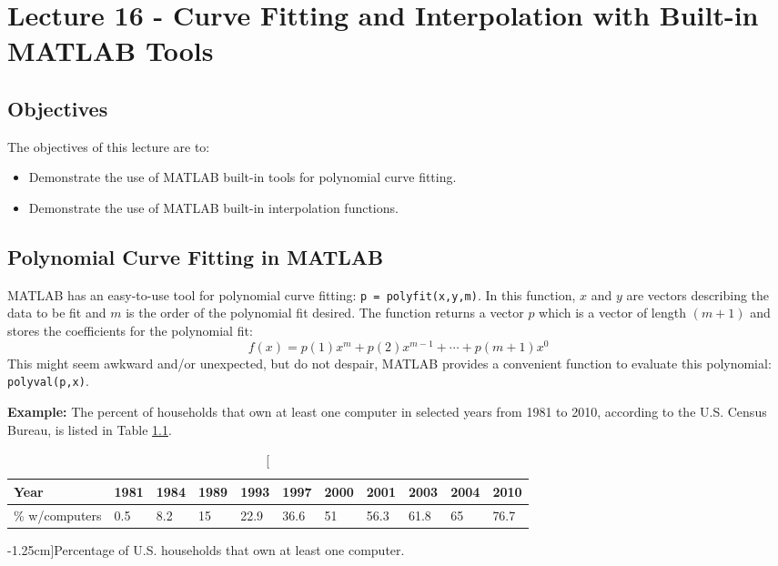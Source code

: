 \chapter{Lecture 16 - Curve Fitting and Interpolation with Built-in MATLAB Tools}
\label{ch:lec16n}
\section{Objectives}
The objectives of this lecture are to:
\begin{itemize}
\item Demonstrate the use of MATLAB built-in tools for polynomial curve fitting.
\item Demonstrate the use of MATLAB built-in interpolation functions.
\end{itemize}
\setcounter{lstannotation}{0}

\section{Polynomial Curve Fitting in MATLAB}

MATLAB has an easy-to-use tool for polynomial curve fitting: \lstinline[style=myMatlab]{p = polyfit(x,y,m)}.  In this function, $x$ and $y$ are vectors describing the data to be fit and $m$ is the order of the polynomial fit desired.  The function returns a vector $p$ which is a vector of length $(m+1)$ and stores the coefficients for the polynomial fit:
\begin{equation*}
f(x) = p(1)x^{m} + p(2)x^{m-1} + \cdots + p(m+1)x^0
\end{equation*}  
This might seem awkward and/or unexpected, but do not despair, MATLAB provides a convenient function to evaluate this polynomial: \lstinline[style=myMatlab]{polyval(p,x)}.  

\vspace{0.25cm}

\noindent\textbf{Example:} The percent of households that own at least one computer in selected years from 1981 to 2010, according to the U.S. Census Bureau, is listed in Table \ref{tab:lec16n-ex1}.

\begin{table}
\begin{tabular}{|l|l|l|l|l|l|l|l|l|l|l|}
\hline
Year & 1981 & 1984 & 1989 & 1993 & 1997 & 2000 & 2001 & 2003 & 2004 & 2010 \\ \hline
\% w/computers & 0.5 & 8.2 & 15 & 22.9 & 36.6 & 51 & 56.3 & 61.8 & 65 & 76.7 \\ \hline
\end{tabular}
\caption[][-1.25cm]{Percentage of U.S. households that own at least one computer.}
\label{tab:lec16n-ex1}
\end{table} 

